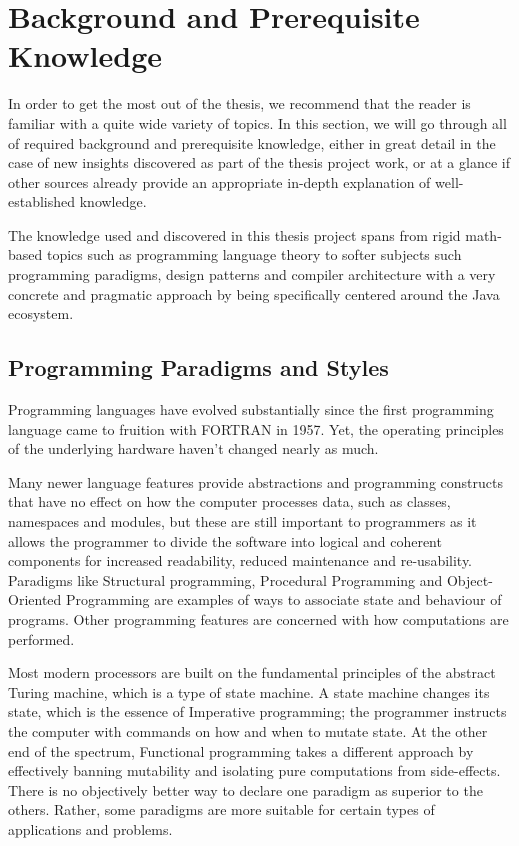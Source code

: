 \chapter{Background and Prerequisite Knowledge} \label{sec:background}

In order to get the most out of the thesis, we recommend that the reader is familiar with a quite wide variety of topics.
In this section, we will go through all of required background and prerequisite knowledge, either in great detail in the case of new insights discovered
as part of the thesis project work, or at a glance if other sources already provide an appropriate in-depth explanation of well-established knowledge.

The knowledge used and discovered in this thesis project spans from rigid math-based topics such as programming language theory to softer subjects such 
programming paradigms, design patterns and compiler architecture with a very concrete and pragmatic approach by being specifically centered around the Java 
ecosystem.

\section{Programming Paradigms and Styles}

Programming languages have evolved substantially since the first programming language came 
to fruition with FORTRAN in 1957. Yet, the operating principles of the underlying hardware 
haven't changed nearly as much. 

Many newer language features provide abstractions and 
programming constructs that have no effect on how the computer processes data, such as
classes, namespaces and modules, but these are still important to programmers as it allows
the programmer to divide the software into logical and coherent components for increased
readability, reduced maintenance and re-usability. Paradigms like Structural programming, 
Procedural Programming and Object-Oriented Programming are examples of ways to associate 
state and behaviour of programs. Other programming features are concerned with how 
computations are performed. 

Most modern processors are built on the fundamental principles of the abstract Turing 
machine, which is a type of state machine. A state machine changes its state, which is the 
essence of Imperative programming; the programmer instructs the computer with commands on
how and when to mutate state. At the other end of the spectrum, Functional programming takes 
a different approach by effectively banning mutability and isolating pure computations from 
side-effects. There is no objectively better way to declare one paradigm as superior to the 
others. Rather, some paradigms are more suitable for certain types of applications and 
problems. 

